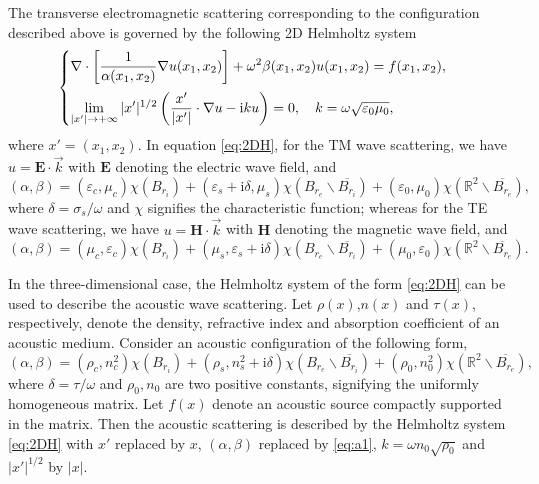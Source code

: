 \documentclass[11pt,reqno,twoside]{amsart}
\theoremstyle{definition}
\theoremstyle{remark}
\numberwithin{equation}{section}
\begin{document}
The transverse electromagnetic scattering corresponding to the configuration described above is governed by the following 2D Helmholtz system
\begin{equation}\label{eq:2DH}
\begin{cases}
\displaystyle{\nabla\cdot\left[\frac{1}{\alpha(x_1,x_2)}\nabla u(x_1,x_2)\right]+\omega^2\beta(x_1,x_2) u(x_1,x_2)=f(x_1,x_2),}\medskip\\
\displaystyle{\lim_{|x'|\rightarrow+\infty} |x'|^{1/2}\left(\frac{x'}{|x'|}\cdot\nabla u-\mathrm{i} k u  \right)=0,\quad k=\omega\sqrt{\varepsilon_0\mu_0},}
\end{cases}
\end{equation}
where $x'=(x_1,x_2)$. In equation \eqref{eq:2DH}, for the TM wave scattering, we have $u=\mathbf{E}\cdot \vec{k}$ with $\mathbf{E}$ denoting the electric wave field, and
\begin{equation}\label{eq:tm2d}
(\alpha,\beta)=(\varepsilon_c,\mu_c)\chi(B_{r_i})+(\varepsilon_s+\mathrm{i}\delta,\mu_s)\chi(B_{r_e}\backslash\overline{B_{r_i}})+(\varepsilon_0,\mu_0)\chi(\mathbb{R}^2\backslash\overline{B_{r_e}}),
\end{equation}
where $\delta=\sigma_s/\omega$ and $\chi$ signifies the characteristic function; whereas for the TE wave scattering, we have $u=\mathbf{H}\cdot \vec{k}$ with $\mathbf{H}$ denoting the magnetic wave field, and
\begin{equation}\label{eq:tm2d}
(\alpha,\beta)=(\mu_c,\varepsilon_c)\chi(B_{r_i})+(\mu_s,\varepsilon_s+\mathrm{i}\delta)\chi(B_{r_e}\backslash\overline{B_{r_i}})+(\mu_0, \varepsilon_0)\chi(\mathbb{R}^2\backslash\overline{B_{r_e}}).
\end{equation}

In the three-dimensional case, the Helmholtz system of the form \eqref{eq:2DH} can be used to describe the acoustic wave scattering. Let $\rho(x)$,$n(x)$ and $\tau(x)$, respectively, denote the density, refractive index and absorption coefficient of an acoustic medium. Consider an acoustic configuration of the following form,
\begin{equation}\label{eq:a1}
(\alpha, \beta)=(\rho_c,n_c^2)\chi(B_{r_i})+(\rho_s, n_s^2+\mathrm{i}\delta)\chi(B_{r_e}\backslash\overline{B_{r_i}})+(\rho_0, n_0^2)\chi(\mathbb{R}^2\backslash\overline{B_{r_e}}),
\end{equation}
where $\delta=\tau/\omega$ and $\rho_0, n_0$ are two positive constants, signifying the uniformly homogeneous matrix. Let $f(x)$ denote an acoustic source compactly supported in the matrix. Then the acoustic scattering is described by the Helmholtz system \eqref{eq:2DH} with $x'$ replaced by $x$, $(\alpha, \beta)$ replaced by \eqref{eq:a1}, $k=\omega n_0\sqrt{\rho_0}$ and $|x'|^{1/2}$ by $|x|$.
\end{document}
